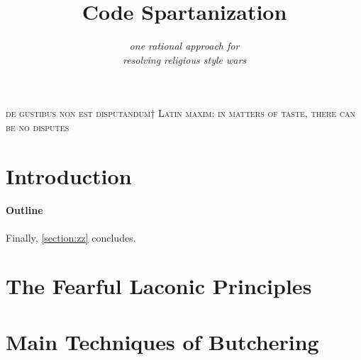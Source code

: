 \documentclass[preprint,10pt,nonatbib]{sigplanconf}
\title{Code Spartanization}
\subtitle{\scriptsize \emph{one rational approach for \\ resolving  religious style wars}}
\begin{document}
\textsc{de gustibus non est disputandum†{%
    Latin maxim: in matters of taste, there can be no disputes
}}
{\let\newpage\relax\maketitle}
% 
% 


\begin{abstract}
  
\end{abstract}
\section{Introduction}


\paragraph{Outline}
\label{section:principia}
\label{section:techniques}
\label{section:look}
\label{section:jack}
\label{section:look}
\label{section:initial}
\label{section:zz}
Finally, \cref{section:zz} concludes.

\section{The Fearful Laconic Principles}
\label{section:principia}


\section{Main Techniques of Butchering}
\label{section:techniques}

\end{document}
